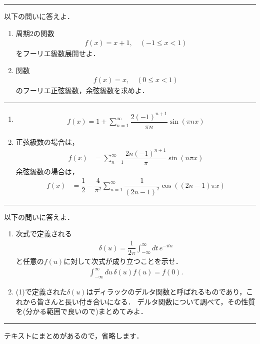 \documentclass[11pt,a4]{jsarticle}
\numberwithin{equation}{section}
\begin{document}
%
\newpage
%
\hrule
\enshu
以下の問いに答えよ．
\begin{enumerate}[(1)]
  \item 周期$2$の関数
	\begin{align*}
	  f(x) = x+1, \quad (-1\leq x < 1) 
	\end{align*}
	をフーリエ級数展開せよ．
  \item 関数
	\begin{align*}
	  f(x) = x, \quad (0\leq x < 1) 
	\end{align*}
	のフーリエ正弦級数，余弦級数を求めよ．
\end{enumerate}
\hrule
%
\begin{enumerate}[(1)]
  \item 
    \begin{align*}
      f(x) = 1 + \sum_{n=1}^{\infty}\dfrac{2(-1)^{n+1} }{\pi n} \sin (\pi nx) 
    \end{align*}
  \item
    正弦級数の場合は，
      \begin{align*}
        f\left(x\right) & =\sum_{n=1}^{\infty}\dfrac{2n\left(-1\right)^{n+1}}{\pi}\sin\left(n\pi x\right)   
      \end{align*}
    余弦級数の場合は，
      \begin{align*}
	f\left(x\right) & =\dfrac{1}{2}-\dfrac{4}{\pi^{2}}\sum_{n=1}^{\infty}\dfrac{1}{\left(2n-1\right)^{2}}\cos\left(\left(2n-1\right)\pi x\right)
      \end{align*}
\end{enumerate}
%
\newpage
%
\hrule
\enshu
%
以下の問いに答えよ．
\begin{enumerate}[(1)]
\item 
次式で定義される
\begin{align*}
 \delta (u) = \dfrac{1}{2\pi}\int_{-\infty}^{\infty}dt\,e^{-itu}
\end{align*}
と任意の$f(u)$に対して次式が成り立つことを示せ．
\begin{align*}
 \int_{-\infty}^{\infty}du\,\delta(u)f(u)=f(0). 
\end{align*}
\item (1)で定義された$\delta(u)$はディラックのデルタ関数と呼ばれるものであり，これから皆さんと長い付き合いになる．
      デルタ関数について調べて，その性質を(分かる範囲で良いので)まとめてみよ．
\end{enumerate}
%
\hrule
%
\vspace*{.2cm}
テキストにまとめがあるので，省略します．
\end{document}
